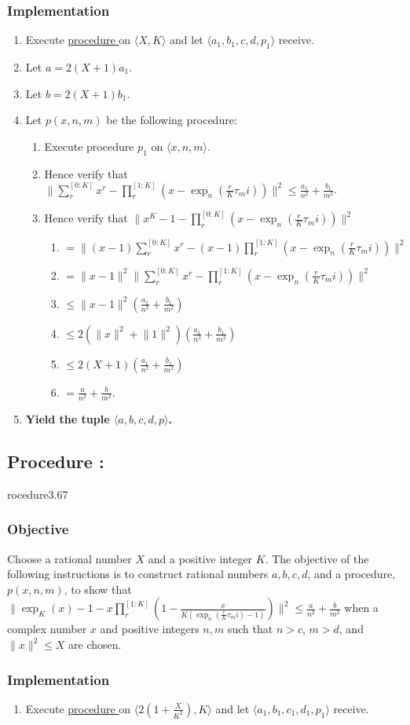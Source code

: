 \documentclass{article}
\newcounter{procedure}[part]
\newcommand{\procedure}[1]{\subsection*{Procedure \thepart:\theprocedure}\label{sec:procedure #1}\global\expandafter\edef\csname procedure#1\endcsname{\thepart:\theprocedure}\addtocounter{procedure}{1}}
\newcommand{\objective}{\subsubsection*{Objective}}
\newcommand{\implementation}{\subsubsection*{Implementation}}
\newcommand{\procedurehr}[1]{\hyperref[sec:procedure #1]{procedure \expandafter\csname procedure#1\endcsname}}
\begin{document}
\begin{multicols}{2}
			\implementation
				\begin{enumerate}
					\item Execute \procedurehr{3.65} on $\langle X,K\rangle$ and let $\langle a_1,b_1,c,d,p_1\rangle$ receive.
					\item Let $a=2(X+1)a_1$.
					\item Let $b=2(X+1)b_1$.
					\item Let $p(x,n,m)$ be the following procedure:
					\begin{enumerate}
						\item Execute procedure $p_1$ on $\langle x,n,m\rangle$.
						\item Hence verify that $\lVert\sum_r^{[0:K]}x^r-\prod_r^{[1:K]}(x-\exp_n(\frac{r}{K}\tau_mi))\rVert^2\le\frac{a_1}{n^2}+\frac{b_1}{m^2}$.
						\item Hence verify that $\lVert x^K-1-\prod_r^{[0:K]}(x-\exp_n(\frac{r}{K}\tau_mi))\rVert^2$
						\begin{enumerate}
							\item $=\lVert(x-1)\sum_r^{[0:K]}x^r-(x-1)\prod_r^{[1:K]}(x-\exp_n(\frac{r}{K}\tau_mi))\rVert^2$
							\item $=\lVert x-1\rVert^2\lVert\sum_r^{[0:K]}x^r-\prod_r^{[1:K]}(x-\exp_n(\frac{r}{K}\tau_mi))\rVert^2$
							\item $\le\lVert x-1\rVert^2(\frac{a_1}{n^2}+\frac{b_1}{m^2})$
							\item $\le 2(\lVert x\rVert^2+\lVert 1\rVert^2)(\frac{a_1}{n^2}+\frac{b_1}{m^2})$
							\item $\le 2(X+1)(\frac{a_1}{n^2}+\frac{b_1}{m^2})$
							\item $=\frac{a}{n^2}+\frac{b}{m^2}$.
						\end{enumerate}
					\end{enumerate}
					\item \textbf{Yield the tuple $\langle a,b,c,d,p\rangle$.}
				\end{enumerate}
		\procedure{3.67}
			\objective
				Choose a rational number $X$ and a positive integer $K$. The objective of the following instructions is to construct rational numbers $a,b,c,d$, and a procedure, $p(x,n,m)$, to show that $\lVert\exp_K(x)-1-x\prod_r^{[1:K]}(1-\frac{x}{K(\exp_n(\frac{r}{K}\tau_mi)-1)})\rVert^2\le\frac{a}{n^2}+\frac{b}{m^2}$ when a complex number $x$ and positive integers $n,m$ such that $n>c$, $m>d$, and $\lVert x\rVert^2\le X$ are chosen.
			\implementation
				\begin{enumerate}
					\item Execute \procedurehr{3.66} on $\langle 2(1+\frac{X}{K^2}),K\rangle$ and let $\langle a_1,b_1,c_1,d_1,p_1\rangle$ receive.

\end{enumerate}
\end{multicols}
\end{document}
